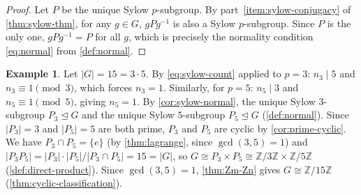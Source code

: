 \documentclass[12pt,a4paper]{article}
\theoremstyle{definition}
\newtheorem{example}[definition]{Example}
\theoremstyle{plain}
\theoremstyle{remark}
\newcommand{\Z}{\mathbb{Z}}
\newcommand{\normal}{\trianglelefteq}
\begin{document}
\begin{proof}
Let $P$ be the unique Sylow $p$-subgroup.
By part~\ref{item:sylow-conjugacy} of \cref{thm:sylow-thm}, for any $g \in G$,
$gPg^{-1}$ is also a Sylow $p$-subgroup. Since $P$ is the only one,
$gPg^{-1} = P$ for all $g$, which is precisely the normality condition
\cref{eq:normal} from \cref{def:normal}.
\end{proof}

\begin{example}\label{ex:sylow-15}
Let $|G| = 15 = 3 \cdot 5$.
By \cref{eq:sylow-count} applied to $p = 3$: $n_3 \mid 5$ and
$n_3 \equiv 1 \pmod{3}$, which forces $n_3 = 1$.
Similarly, for $p = 5$: $n_5 \mid 3$ and $n_5 \equiv 1 \pmod{5}$,
giving $n_5 = 1$.
By \cref{cor:sylow-normal}, the unique Sylow $3$-subgroup $P_3 \normal G$
and the unique Sylow $5$-subgroup $P_5 \normal G$ (\cref{def:normal}).
Since $|P_3| = 3$ and $|P_5| = 5$ are both prime, $P_3$ and $P_5$ are cyclic
by \cref{cor:prime-cyclic}. We have $P_3 \cap P_5 = \{e\}$
(by \cref{thm:lagrange}, since $\gcd(3,5) = 1$) and
$|P_3 P_5| = |P_3| \cdot |P_5| / |P_3 \cap P_5| = 15 = |G|$,
so $G \cong P_3 \times P_5 \cong \Z/3\Z \times \Z/5\Z$
(\cref{def:direct-product}). Since $\gcd(3,5) = 1$,
\cref{thm:Zm-Zn} gives $G \cong \Z/15\Z$
(\cref{thm:cyclic-classification}).
\end{example}
\end{document}
